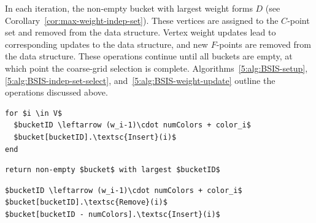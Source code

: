 \documentclass{elsart}
\begin{document}
In each iteration, the non-empty bucket with largest weight forms $D$
(see Corollary~\ref{cor:max-weight-indep-set}). These vertices are
assigned to the $C$-point set and removed from the data
structure. Vertex weight updates lead to corresponding updates to the
data structure, and new $F$-points are removed from the data
structure. These operations continue until all buckets are empty, at
which point the coarse-grid selection is
complete. Algorithms~\ref{5:alg:BSIS-setup},
\ref{5:alg:BSIS-indep-set-select}, and~\ref{5:alg:BSIS-weight-update}
outline the operations discussed above.
\begin{lstlisting}[caption={BSIS Data Structure Setup},label=5:alg:BSIS-setup]
%\textsc{BSIS-Setup}$(S)$%
for $i \in V$
  $bucketID \leftarrow (w_i-1)\cdot numColors + color_i$
  $bucket[bucketID].\textsc{Insert}(i)$
end
\end{lstlisting}
\begin{lstlisting}[caption={Independent Set Selection},label=5:alg:BSIS-indep-set-select]
%\textsc{BSIS-Independent-Set-Selection}$(S)$%
return non-empty $bucket$ with largest $bucketID$
\end{lstlisting}
\begin{lstlisting}[caption={BSIS Weight Update},label=5:alg:BSIS-weight-update]
%\textsc{BSIS-Weight-Update}$(S,\, i)$%
$bucketID \leftarrow (w_i-1)\cdot numColors + color_i$
$bucket[bucketID].\textsc{Remove}(i)$
$bucket[bucketID - numColors].\textsc{Insert}(i)$
\end{lstlisting}
\end{document}
